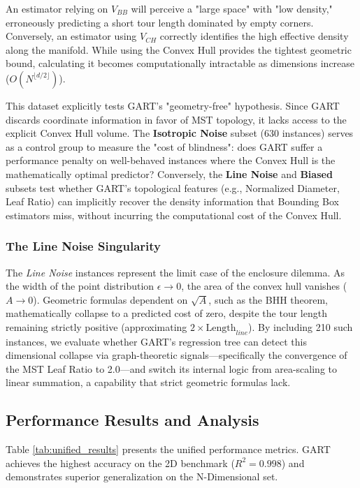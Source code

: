 \documentclass{article}
\begin{document}
An estimator relying on $V_{BB}$ will perceive a "large space" with "low density," erroneously predicting a short tour length dominated by empty corners. Conversely, an estimator using $V_{CH}$ correctly identifies the high effective density along the manifold. While using the Convex Hull provides the tightest geometric bound, calculating it becomes computationally intractable as dimensions increase ($O(N^{\lfloor d/2 \rfloor})$).

This dataset explicitly tests GART's "geometry-free" hypothesis. Since GART discards coordinate information in favor of MST topology, it lacks access to the explicit Convex Hull volume. The \textbf{Isotropic Noise} subset (630 instances) serves as a control group to measure the "cost of blindness": does GART suffer a performance penalty on well-behaved instances where the Convex Hull is the mathematically optimal predictor? Conversely, the \textbf{Line Noise} and \textbf{Biased} subsets test whether GART's topological features (e.g., Normalized Diameter, Leaf Ratio) can implicitly recover the density information that Bounding Box estimators miss, without incurring the computational cost of the Convex Hull.

\subsubsection{The Line Noise Singularity}
The \textit{Line Noise} instances represent the limit case of the enclosure dilemma. As the width of the point distribution $\epsilon \to 0$, the area of the convex hull vanishes ($A \to 0$). Geometric formulas dependent on $\sqrt{A}$, such as the BHH theorem, mathematically collapse to a predicted cost of zero, despite the tour length remaining strictly positive (approximating $2 \times \text{Length}_{line}$). By including 210 such instances, we evaluate whether GART's regression tree can detect this dimensional collapse via graph-theoretic signals—specifically the convergence of the MST Leaf Ratio to 2.0—and switch its internal logic from area-scaling to linear summation, a capability that strict geometric formulas lack.

\subsection{Performance Results and Analysis}

Table \ref{tab:unified_results} presents the unified performance metrics. GART achieves the highest accuracy on the 2D benchmark ($R^2=0.998$) and demonstrates superior generalization on the N-Dimensional set.
\end{document}
